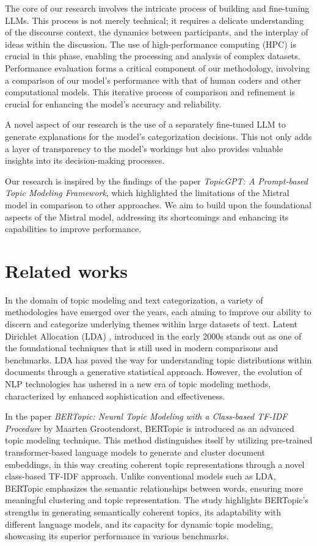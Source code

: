 \documentclass[fleqn,moreauthors,10pt]{ds_report}
\begin{document}
The core of our research involves the intricate process of building and fine-tuning LLMs. This process is not merely technical; it requires a delicate understanding of the discourse context, the dynamics between participants, and the interplay of ideas within the discussion. The use of high-performance computing (HPC) is crucial in this phase, enabling the processing and analysis of complex datasets. Performance evaluation forms a critical component of our methodology, involving a comparison of our model's performance with that of human coders and other computational models. This iterative process of comparison and refinement is crucial for enhancing the model's accuracy and reliability.

A novel aspect of our research is the use of a separately fine-tuned LLM to generate explanations for the model's categorization decisions. This not only adds a layer of transparency to the model's workings but also provides valuable insights into its decision-making processes.

Our research is inspired by the findings of the paper \textit{TopicGPT: A Prompt-based Topic Modeling Framework}, which highlighted the limitations of the Mistral model in comparison to other approaches. We aim to build upon the foundational aspects of the Mistral model, addressing its shortcomings and enhancing its capabilities to improve performance.
	

\section*{Related works}
In the domain of topic modeling and text categorization, a variety of methodologies have emerged over the years, each aiming to improve our ability to discern and categorize underlying themes within large datasets of text. Latent Dirichlet Allocation (LDA) \cite{Blei2003LatentDA}, introduced in the early 2000s stands out as one of the foundational techniques that is still used in modern comparisons and benchmarks. LDA has paved the way for understanding topic distributions within documents through a generative statistical approach. However, the evolution of NLP technologies has ushered in a new era of topic modeling methods, characterized by enhanced sophistication and effectiveness. 

In the paper \textit{BERTopic: Neural Topic Modeling with a Class-based TF-IDF Procedure} by Maarten Grootendorst, BERTopic is introduced as an advanced topic modeling technique. This method distinguishes itself by utilizing pre-trained transformer-based language models to generate and cluster document embeddings, in this way creating coherent topic representations through a novel class-based TF-IDF approach. Unlike conventional models such as LDA, BERTopic emphasizes the semantic relationships between words, ensuring more meaningful clustering and topic representation. The study highlights BERTopic's strengths in generating semantically coherent topics, its adaptability with different language models, and its capacity for dynamic topic modeling, showcasing its superior performance in various benchmarks. 
\end{document}

